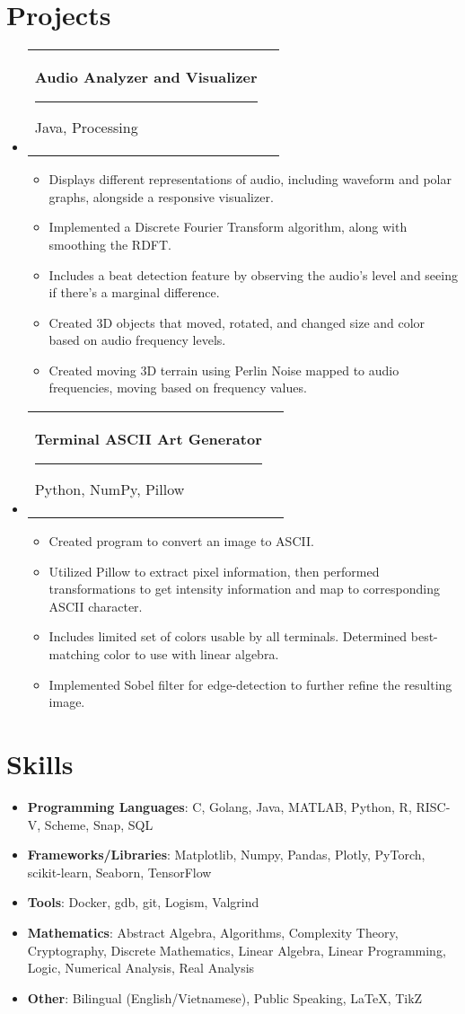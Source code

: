 \documentclass[letterpaper,11pt]{article}
\makeatletter
\newcommand{\resumeItem}[2]{
	\item\small{
		\textbf{#1}{: #2 \vspace{-2pt}}
	}
}
\newcommand{\resumeItemTwo}[1]{
	\item\small{
		#1 \vspace{-2pt}}
}
\newcommand{\resumeSubheadingTwo}[2]{
	\vspace{-1pt}\item
	\begin{tabular*}{0.97\textwidth}[t]{l@{\extracolsep{\fill}}r}
		\textbf{#1} \rule[-0.4ex]{0.1ex}{1.2em} #2 \\
	\end{tabular*}\vspace{-5pt}
}
\newcommand{\resumeSubItem}[2]{\resumeItem{#1}{#2}\vspace{-4pt}}
\newcommand{\resumeSubHeadingListStart}{\begin{itemize}[leftmargin=*]}
\newcommand{\resumeSubHeadingListEnd}{\end{itemize}}
\newcommand{\resumeItemListStart}{\begin{itemize}}
\newcommand{\resumeItemListEnd}{\end{itemize}\vspace{-5pt}}
\makeatother
\begin{document}
	\section{Projects}
	\resumeSubHeadingListStart
	
	\resumeSubheadingTwo
	{Audio Analyzer and Visualizer}{Java, Processing}
	\resumeItemListStart
	\resumeItemTwo{Displays different representations of audio, including waveform and polar graphs, alongside a responsive visualizer.}
	\resumeItemTwo{Implemented a Discrete Fourier Transform algorithm, along with smoothing the RDFT.}
	\resumeItemTwo{Includes a beat detection feature by observing the audio's level and seeing if there's a marginal difference.}
	\resumeItemTwo{Created 3D objects that moved, rotated, and changed size and color based on audio frequency levels.}
	\resumeItemTwo{Created moving 3D terrain using Perlin Noise mapped to audio frequencies, moving based on frequency values.}
	\resumeItemListEnd
	
	\resumeSubheadingTwo
	{Terminal ASCII Art Generator}{Python, NumPy, Pillow}
	\resumeItemListStart
	\resumeItemTwo{Created program to convert an image to ASCII.}
	\resumeItemTwo{Utilized Pillow to extract pixel information, then performed transformations to get intensity information and map to corresponding ASCII character.}
	\resumeItemTwo{Includes limited set of colors usable by all terminals. Determined best-matching color to use with linear algebra.}
	\resumeItemTwo{Implemented Sobel filter for edge-detection to further refine the resulting image.}
	\resumeItemListEnd
	
	\resumeSubHeadingListEnd
	
	\section{Skills}
	\resumeSubHeadingListStart
	\resumeSubItem{Programming Languages}
	{C, Golang, Java, MATLAB, Python, R, RISC-V, Scheme, Snap, SQL}
	\resumeSubItem{Frameworks/Libraries}{Matplotlib, Numpy, Pandas, Plotly, PyTorch, scikit-learn, Seaborn, TensorFlow}
	\resumeSubItem{Tools}{Docker, gdb, git, Logism, Valgrind}
	\resumeSubItem{Mathematics}{Abstract Algebra, Algorithms, Complexity Theory, Cryptography, Discrete Mathematics, Linear Algebra, Linear Programming, Logic, Numerical Analysis, Real Analysis}
	\resumeItem{Other}{Bilingual (English/Vietnamese), Public Speaking, LaTeX, TikZ}
	\resumeSubHeadingListEnd
\end{document}
